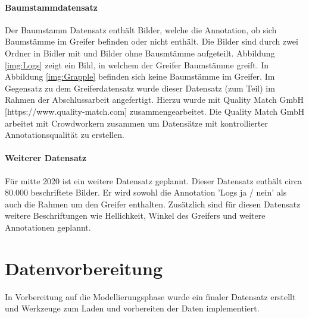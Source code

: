 	\paragraph{Baumstammdatensatz} Der Baumstamm Datensatz enthält Bilder, welche die Annotation, ob sich Baumstämme im Greifer befinden oder nicht enthält. Die Bilder sind durch zwei Ordner in Bidler mit und Bilder ohne Bausmtämme aufgeteilt.  Abbildung \ref{img:Logs} zeigt ein Bild, in welchem der Greifer Baumstämme greift. In Abbildung \ref{img:Grapple} befinden sich keine Baumstämme im Greifer.
	Im Gegensatz zu dem Greiferdatensatz wurde dieser Datensatz (zum Teil) im Rahmen der Abschlussarbeit angefertigt. Hierzu wurde mit Quality Match GmbH [https://www.quality-match.com] zusammengearbeitet. Die Quality Match GmbH  arbeitet mit Crowdworkern zusammen um Datensätze mit kontrollierter Annotationsqualität zu erstellen.  

	\paragraph{Weiterer Datensatz} Für mitte 2020 ist ein weitere Datensatz geplannt. Dieser Datensatz enthält circa 80.000 beschriftete Bilder. Er wird sowohl die Annotation 'Logs ja / nein' als auch die Rahmen um den Greifer enthalten. Zusätzlich sind für diesen Datensatz weitere Beschriftungen wie Hellichkeit, Winkel des Greifers und weitere Annotationen geplannt. 
			
	\section{Datenvorbereitung}
	\label{sec:DataPreparation}
	In Vorbereitung auf die Modellierungsphase wurde ein finaler Datensatz erstellt und Werkzeuge zum Laden und vorbereiten der Daten implementiert.
